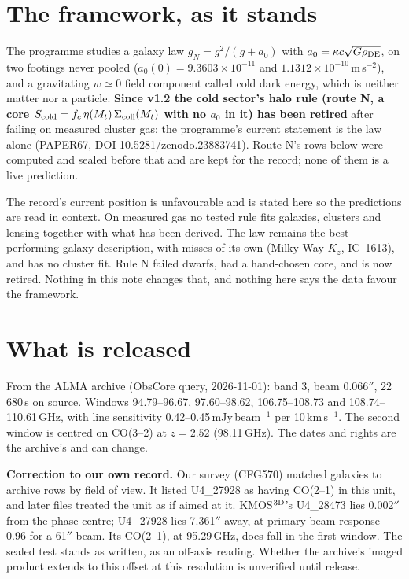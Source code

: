 \documentclass[10pt]{article}
\begin{document}
\section{The framework, as it stands}
The programme studies a galaxy law $g_N=g^2/(g+a_0)$ with $a_0=\kappa c\sqrt{G\rho_{\rm DE}}$, on two footings never pooled ($a_0(0)=9.3603\times10^{-11}$ and $1.1312\times10^{-10}$\,m\,s$^{-2}$), and a gravitating $w\simeq0$ field component called cold dark energy, which is neither matter nor a particle. \textbf{Since v1.2 the cold sector's halo rule (route N, a core $S_{\rm cold}=f_c\,\eta(M_t)\,\Sigma_{\rm coll}(M_t)$ with no $a_0$ in it) has been retired} after failing on measured cluster gas; the programme's current statement is the law alone (PAPER67, DOI 10.5281/zenodo.23883741). Route N's rows below were computed and sealed before that and are kept for the record; none of them is a live prediction.

The record's current position is unfavourable and is stated here so the predictions are read in context. On measured gas no tested rule fits galaxies, clusters and lensing together with what has been derived. The law remains the best-performing galaxy description, with misses of its own (Milky Way $K_z$, IC~1613), and has no cluster fit. Rule N failed dwarfs, had a hand-chosen core, and is now retired. Nothing in this note changes that, and nothing here says the data favour the framework.

\section{What is released}
From the ALMA archive (ObsCore query, 2026-11-01): band 3, beam 0.066$''$, 22\,680\,s on source. Windows 94.79--96.67, 97.60--98.62, 106.75--108.73 and 108.74--110.61\,GHz, with line sensitivity 0.42--0.45\,mJy\,beam$^{-1}$ per 10\,km\,s$^{-1}$. The second window is centred on CO(3--2) at $z=2.52$ (98.11\,GHz). The dates and rights are the archive's and can change.

\textbf{Correction to our own record.} Our survey (CFG570) matched galaxies to archive rows by field of view. It listed U4\_27928 as having CO(2--1) in this unit, and later files treated the unit as if aimed at it. KMOS$^{\rm 3D}$'s U4\_28473 lies 0.002$''$ from the phase centre; U4\_27928 lies 7.361$''$ away, at primary-beam response 0.96 for a 61$''$ beam. Its CO(2--1), at 95.29\,GHz, does fall in the first window. The sealed test stands as written, as an off-axis reading. Whether the archive's imaged product extends to this offset at this resolution is unverified until release.
\end{document}

